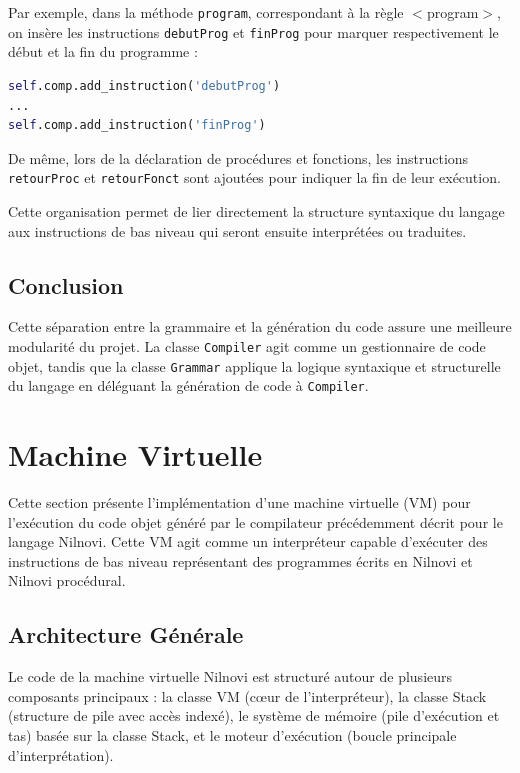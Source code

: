 \documentclass[a4paper, 12pt]{article}
\begin{document}
    Par exemple, dans la méthode \texttt{program}, correspondant à la règle $<$program$>$, on insère les instructions \texttt{debutProg} et \texttt{finProg} pour marquer respectivement le début et la fin du programme :

    \begin{lstlisting}[language=python, xleftmargin=20pt]
self.comp.add_instruction('debutProg')
...
self.comp.add_instruction('finProg') \end{lstlisting}

    De même, lors de la déclaration de procédures et fonctions, les instructions \texttt{retourProc} et \texttt{retourFonct} sont ajoutées pour indiquer la fin de leur exécution.

    Cette organisation permet de lier directement la structure syntaxique du langage aux instructions de bas niveau qui seront ensuite interprétées ou traduites.

    \subsection{Conclusion}

    Cette séparation entre la grammaire et la génération du code assure une meilleure modularité du projet. La classe \texttt{Compiler} agit comme un gestionnaire de code objet, tandis que la classe \texttt{Grammar} applique la logique syntaxique et structurelle du langage en déléguant la génération de code à \texttt{Compiler}.

    \newpage

    \section{Machine Virtuelle}

    Cette section présente l'implémentation d'une machine virtuelle (VM) pour l'exécution du code objet généré par le compilateur précédemment décrit pour le langage Nilnovi. Cette VM agit comme un interpréteur capable d'exécuter des instructions de bas niveau représentant des programmes écrits en Nilnovi et Nilnovi procédural.

    \subsection{Architecture Générale}

    Le code de la machine virtuelle Nilnovi est structuré autour de plusieurs composants principaux : la classe VM (cœur de l'interpréteur), la classe Stack (structure de pile avec accès indexé), le système de mémoire (pile d'exécution et tas) basée sur la classe Stack, et le moteur d'exécution (boucle principale d'interprétation).
\end{document}
